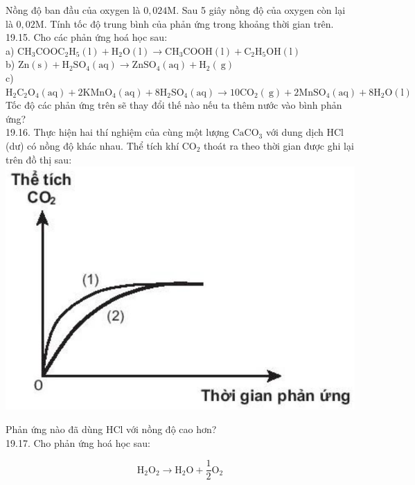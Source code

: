 \documentclass[10pt]{article}
\begin{document}
Nồng độ ban đầu của oxygen là $0,024 \mathrm{M}$. Sau 5 giây nồng độ của oxygen còn lại là $0,02 \mathrm{M}$. Tính tốc độ trung bình của phản ứng trong khoảng thời gian trên.\\
19.15. Cho các phản ứng hoá học sau:\\
a) $\mathrm{CH}_{3} \mathrm{COOC}_{2} \mathrm{H}_{5}(\mathrm{l})+\mathrm{H}_{2} \mathrm{O}(\mathrm{l}) \rightarrow \mathrm{CH}_{3} \mathrm{COOH}(\mathrm{l})+\mathrm{C}_{2} \mathrm{H}_{5} \mathrm{OH}(\mathrm{l})$\\
b) $\mathrm{Zn}(\mathrm{s})+\mathrm{H}_{2} \mathrm{SO}_{4}(\mathrm{aq}) \rightarrow \mathrm{ZnSO}_{4}(\mathrm{aq})+\mathrm{H}_{2}(\mathrm{~g})$\\
c) $\mathrm{H}_{2} \mathrm{C}_{2} \mathrm{O}_{4}(\mathrm{aq})+2 \mathrm{KMnO}_{4}(\mathrm{aq})+8 \mathrm{H}_{2} \mathrm{SO}_{4}(\mathrm{aq}) \rightarrow 10 \mathrm{CO}_{2}(\mathrm{~g})+2 \mathrm{MnSO}_{4}(\mathrm{aq})+8 \mathrm{H}_{2} \mathrm{O}(\mathrm{l})$ Tốc độ các phản ứng trên sẽ thay đổi thế nào nếu ta thêm nước vào bình phản ứng?\\
19.16. Thực hiện hai thí nghiệm của cùng một lượng $\mathrm{CaCO}_{3}$ với dung dịch HCl (dư) có nồng độ khác nhau. Thể tích khí $\mathrm{CO}_{2}$ thoát ra theo thời gian được ghi lại trên đồ thị sau:\\
\includegraphics[max width=\textwidth, center]{2025_10_23_daab5c8457c85b365b9eg-53}

Phản ứng nào đã dùng HCl với nồng độ cao hơn?\\
19.17. Cho phản ứng hoá học sau:

$$
\mathrm{H}_{2} \mathrm{O}_{2} \rightarrow \mathrm{H}_{2} \mathrm{O}+\frac{1}{2} \mathrm{O}_{2}
$$
\end{document}
